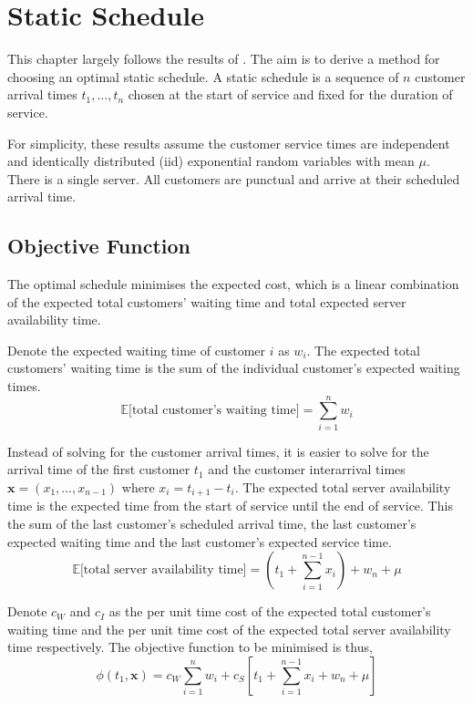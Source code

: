 \chapter{Static Schedule}
\label{chap:Static}
This chapter largely follows the results of \citet{Pegden}. The aim is to derive a method for choosing an optimal static schedule. A static schedule is a sequence of $n$ customer arrival times $t_{1}, \ldots, t_{n}$ chosen at the start of service and fixed for the duration of service. 

For simplicity, these results assume the customer service times are independent and identically distributed (iid) exponential random variables with mean $\mu$. There is a single server. All customers are punctual and arrive at their scheduled arrival time.

\section{Objective Function}
The optimal schedule minimises the expected cost, which is a linear combination of the expected total customers' waiting time and total expected server availability time.

Denote the expected waiting time of customer $i$ as $w_{i}$. The expected total customers' waiting time is the sum of the individual customer's expected waiting times.
\begin{equation}
	\mathbb{E} \Big[\text{total customer's waiting time} \Big] = \sum_{i = 1}^{n} w_{i}
\end{equation}

Instead of solving for the customer arrival times, it is easier to solve for the arrival time of the first customer $t_{1}$ and the customer interarrival times $\mathbf{x} = (x_{1}, \ldots, x_{n - 1})$ where $x_{i} = t_{i + 1} - t_{i}$. The expected total server availability time is the expected time from the start of service until the end of service. This the sum of the last customer's scheduled arrival time, the last customer's expected waiting time and the last customer's expected service time.
\begin{equation}
	\mathbb{E} \Big[\text{total server availability time} \Big] = \left( t_{1} + \sum_{i = 1}^{n - 1} x_{i} \right) + w_{n} + \mu
\end{equation}

Denote $c_{W}$ and $c_{I}$ as the per unit time cost of the expected total customer's waiting time and the per unit time cost of the expected total server availability time respectively. The objective function to be minimised is thus,
\begin{equation}
	\phi (t_{1}, \mathbf{x}) = c_{W} \sum_{i = 1}^{n} w_{i} + c_{S} \left[ t_{1} + \sum_{i = 1}^{n - 1} x_{i} + w_{n} + \mu \right]
\end{equation}


